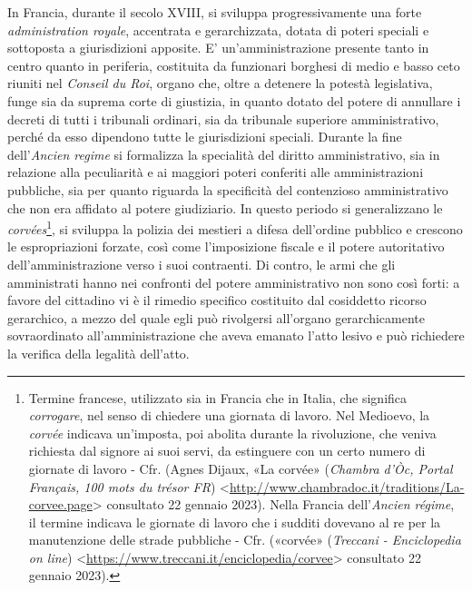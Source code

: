 \documentclass[12pt,it,a4paper,]{report}
\begin{document}
In Francia, durante il secolo XVIII, si sviluppa progressivamente una
forte \emph{administration royale}, accentrata e gerarchizzata, dotata
di poteri speciali e sottoposta a giurisdizioni apposite. E'
un'amministrazione presente tanto in centro quanto in periferia,
costituita da funzionari borghesi di medio e basso ceto riuniti nel
\emph{Conseil du Roi}, organo che, oltre a detenere la potestà
legislativa, funge sia da suprema corte di giustizia, in quanto dotato
del potere di annullare i decreti di tutti i tribunali ordinari, sia da
tribunale superiore amministrativo, perché da esso dipendono tutte le
giurisdizioni speciali. Durante la fine dell'\emph{Ancien regime} si
formalizza la specialità del diritto amministrativo, sia in relazione
alla peculiarità e ai maggiori poteri conferiti alle amministrazioni
pubbliche, sia per quanto riguarda la specificità del contenzioso
amministrativo che non era affidato al potere giudiziario. In questo
periodo si generalizzano le \emph{corvées}\footnote{Termine francese,
  utilizzato sia in Francia che in Italia, che significa
  \emph{corrogare}, nel senso di chiedere una giornata di lavoro. Nel
  Medioevo, la \emph{corvée} indicava un'imposta, poi abolita durante la
  rivoluzione, che veniva richiesta dal signore ai suoi servi, da
  estinguere con un certo numero di giornate di lavoro - Cfr. (Agnes
  Dijaux, {«La corvée»} (\emph{Chambra d'Òc, Portal Français, 100 mots
  du trésor FR})
  \textless{}\url{http://www.chambradoc.it/traditions/La-corvee.page}\textgreater{}
  consultato 22 gennaio 2023). Nella Francia dell'\emph{Ancien régime},
  il termine indicava le giornate di lavoro che i sudditi dovevano al re
  per la manutenzione delle strade pubbliche - Cfr. ({«corvée»}
  (\emph{Treccani - Enciclopedia on line})
  \textless{}\url{https://www.treccani.it/enciclopedia/corvee}\textgreater{}
  consultato 22 gennaio 2023).}, si sviluppa la polizia dei mestieri a
difesa dell'ordine pubblico e crescono le espropriazioni forzate, così
come l'imposizione fiscale e il potere autoritativo dell'amministrazione
verso i suoi contraenti. Di contro, le armi che gli amministrati hanno
nei confronti del potere amministrativo non sono così forti: a favore
del cittadino vi è il rimedio specifico costituito dal cosiddetto
ricorso gerarchico, a mezzo del quale egli può rivolgersi all'organo
gerarchicamente sovraordinato all'amministrazione che aveva emanato
l'atto lesivo e può richiedere la verifica della legalità dell'atto.
\end{document}
